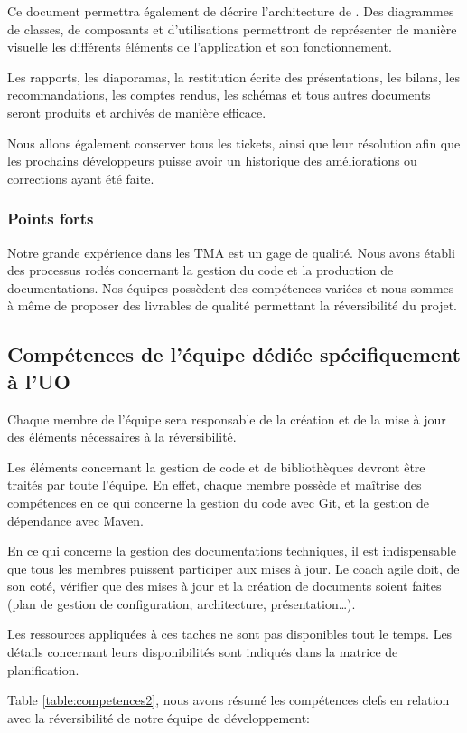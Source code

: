 	Ce document permettra également de décrire l’architecture de \correlyce{}. Des diagrammes de classes, de composants et d’utilisations permettront de représenter de manière visuelle les différents éléments de l’application et son fonctionnement.
	
	Les rapports, les diaporamas, la restitution écrite des présentations, les bilans, les recommandations, les comptes rendus, les schémas et tous autres documents seront produits et archivés de manière efficace.
	
	Nous allons également conserver tous les tickets, ainsi que leur résolution afin que les prochains développeurs puisse avoir un historique des améliorations ou corrections ayant été faite.
	
	\subsubsection{Points forts}
	Notre grande expérience dans les TMA est un gage de qualité. Nous avons établi des processus rodés concernant la gestion du code et la production de documentations. Nos équipes possèdent des compétences variées et nous sommes à même de proposer des livrables de qualité permettant la réversibilité du projet. 
	
	\subsection{Compétences de l'équipe dédiée spécifiquement à l'UO}	
	Chaque membre de l’équipe sera responsable de la création et de la mise à jour des éléments nécessaires à la réversibilité. 
	
	Les éléments concernant la gestion de code et de bibliothèques devront être traités par toute l’équipe. En effet, chaque membre possède et maîtrise des compétences en ce qui concerne la gestion du code avec Git, et la gestion de dépendance avec Maven.
	
	En ce qui concerne la gestion des documentations techniques, il est indispensable que tous les membres puissent participer aux mises à jour. Le coach agile doit, de son coté, vérifier que des mises à jour et la création de documents soient faites (plan de gestion de configuration, architecture, présentation…).
	
	Les ressources appliquées à ces taches ne sont pas disponibles tout le temps. Les détails concernant leurs disponibilités sont indiqués dans la matrice de planification.
	
	Table \ref{table:competences2}, nous avons résumé les compétences clefs en relation avec la réversibilité de notre équipe de développement:
	
